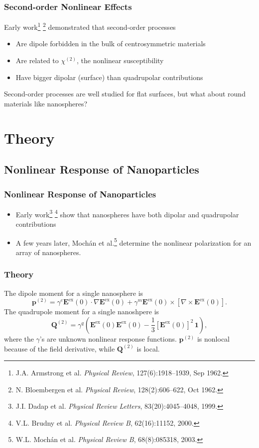 \documentclass{beamer}
\begin{document}
\begin{frame}
\frametitle{Second-order Nonlinear Effects}
Early work\footnote{J.A. Armstrong et al. \emph{Physical Review}, 127(6):1918--1939, Sep 1962.} \footnote{N. Bloembergen et al. \emph{Physical Review}, 128(2):606--622, Oct 1962.} demonstrated that second-order processes
\begin{itemize}
\item Are dipole forbidden in the bulk of centrosymmetric materials
\item Are related to $\chi^{(2)}$, the nonlinear susceptibility
\item Have bigger dipolar (surface) than quadrupolar contributions
\end{itemize}\vfill
\begin{center}
Second-order processes are well studied for flat surfaces, but what about round materials like nanospheres?
\end{center}
\end{frame}

\section{Theory}
\subsection{Nonlinear Response of Nanoparticles}
\begin{frame}
\frametitle{Nonlinear Response of Nanoparticles}
\begin{itemize}
\item Early work\footnote{J.I. Dadap et al. \emph{Physical Review Letters}, 83(20):4045--4048, 1999.} \footnote{V.L. Brudny et al. \emph{Physical Review B}, 62(16):11152, 2000.} show that nanospheres have both dipolar and quadrupolar contributions
\item A few years later, Moch\'an et al.\footnote{W.L. Moch\'an et al. \emph{Physical Review B}, 68(8):085318, 2003.} determine the nonlinear polarization for an array of nanospheres.
\end{itemize}
\end{frame}

\begin{frame}
\frametitle{Theory}
The dipole moment for a single nanosphere is
\begin{equation}
\mathbf{p}^{(2)} = \gamma^{e}\mathbf{E}^{\text{ex}}(0)\cdot\nabla\mathbf{E}^{\text{ex}}(0) + \gamma^{m}\mathbf{E}^{\text{ex}}(0)\times\left[\nabla\times\mathbf{E}^{\text{ex}}(0)\right].\label{dipole}
\end{equation}
The quadrupole moment for a single nanoshpere is
\begin{equation}
\mathbf{Q}^{(2)} = \gamma^{q}\left(\mathbf{E}^{\text{ex}}(0)\mathbf{E}^{\text{ex}}(0) - \frac{1}{3}[\mathbf{E}^{\text{ex}}(0)]^{2}\,\mathbf{1}\right),\label{quad}
\end{equation}
where the $\gamma$'s are unknown nonlinear response functions. $\mathbf{p}^{(2)}$ is nonlocal because of the field derivative, while $\mathbf{Q}^{(2)}$ is local.
\end{frame}
\end{document}
